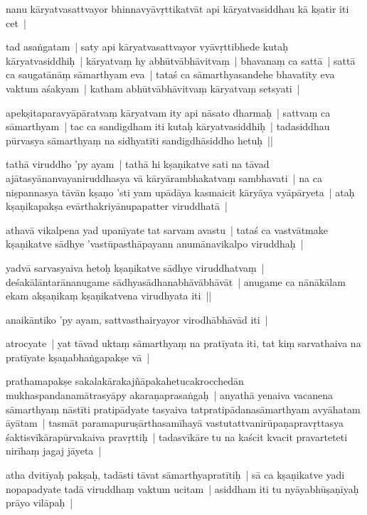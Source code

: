 \documentclass[article,12pt,a4paper]{memoir}
\begin{document}
	  \pstart nanu kāryatvasattvayor bhinnavyāvṛttikatvāt  api kāryatvasiddhau kā kṣatir iti cet |
	\pend
      

	  \pstart tad asaṅgatam | saty api kāryatvasattvayor vyāvṛttibhede  kutaḥ kāryatvasiddhiḥ | kāryatvaṃ hy abhūtvābhāvitvaṃ | bhavanaṃ ca sattā | sattā ca saugatānāṃ sāmarthyam eva | tataś ca sāmarthyasandehe bhavatīty eva vaktum aśakyam | katham abhūtvābhāvitvaṃ kāryatvaṃ setsyati |
	\pend
      

	  \pstart apekṣitaparavyāpāratvaṃ kāryatvam ity api nāsato dharmaḥ | sattvaṃ ca sāmarthyam | tac ca sandigdham iti kutaḥ kāryatvasiddhiḥ | tadasiddhau pūrvasya sāmarthyaṃ na sidhyatīti sandigdhāsiddho hetuḥ || 
	\pend
      

	  \pstart tathā viruddho 'py ayam | tathā hi kṣaṇikatve sati na tāvad ajātasyānanvayaniruddhasya vā kāryārambhakatvaṃ sambhavati | na ca niṣpannasya tāvān kṣaṇo 'sti yam upādāya kasmaicit kāryāya vyāpāryeta | ataḥ kṣaṇikapakṣa evārthakriyānupapatter viruddhatā | 
	\pend
      

	  \pstart athavā vikalpena yad upanīyate tat sarvam avastu | tataś ca vastvātmake kṣaṇikatve sādhye 'vastūpasthāpayann anumānavikalpo viruddhaḥ | 
	\pend
      

	  \pstart yadvā sarvasyaiva hetoḥ kṣaṇikatve sādhye viruddhatvaṃ | deśakālāntarānanugame sādhyasādhanabhāvābhāvāt | anugame ca nānākālam ekam akṣaṇikaṃ kṣaṇikatvena virudhyata iti ||
	\pend
      

	  \pstart anaikāntiko 'py ayam, sattvasthairyayor virodhābhāvād iti |
	\pend
      

	  \pstart atrocyate | yat tāvad uktaṃ sāmarthyaṃ na pratīyata iti, tat kiṃ sarvathaiva na pratīyate kṣaṇabhaṅgapakṣe vā |
	\pend
      

	  \pstart prathamapakṣe sakalakārakajñāpakahetucakrocchedān mukhaspandanamātrasyāpy akaraṇaprasaṅgaḥ | anyathā yenaiva vacanena sāmarthyaṃ nāstīti pratipādyate tasyaiva tatpratipādanasāmarthyam avyāhatam āyātam | tasmāt paramapuruṣārthasamīhayā vastutattvanirūpaṇapravṛttasya śaktisvīkārapūrvakaiva pravṛttiḥ | tadasvīkāre tu na kaścit kvacit pravarteteti nirīhaṃ jagaj jāyeta |
	\pend
      

	  \pstart atha dvitīyaḥ pakṣaḥ, tadāsti tāvat sāmarthyapratītiḥ | sā ca kṣaṇikatve yadi nopapadyate tadā viruddhaṃ vaktum ucitam | asiddham iti tu nyāyabhūṣaṇīyaḥ prāyo vilāpaḥ | 
	\pend
      
\end{document}

